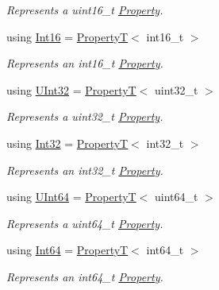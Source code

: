 \begin{DoxyCompactItemize}
\begin{DoxyCompactList}\small\item\em Represents a {\ttfamily uint16\+\_\+t} \hyperlink{classdg_1_1deepcore_1_1_property}{Property}. \end{DoxyCompactList}\item 
using \hyperlink{group___process_properties_ga1dc9580e4c353c4fbe9f0b5908bc474a}{Int16} = \hyperlink{structdg_1_1deepcore_1_1_property_t}{PropertyT}$<$ int16\+\_\+t $>$
\begin{DoxyCompactList}\small\item\em Represents an {\ttfamily int16\+\_\+t} \hyperlink{classdg_1_1deepcore_1_1_property}{Property}. \end{DoxyCompactList}\item 
using \hyperlink{group___process_properties_gaf4b72b7a32150a9db0aa1ce09139aa15}{U\+Int32} = \hyperlink{structdg_1_1deepcore_1_1_property_t}{PropertyT}$<$ uint32\+\_\+t $>$
\begin{DoxyCompactList}\small\item\em Represents a {\ttfamily uint32\+\_\+t} \hyperlink{classdg_1_1deepcore_1_1_property}{Property}. \end{DoxyCompactList}\item 
using \hyperlink{group___process_properties_gaccf8e71b795f75082ef758708db84edd}{Int32} = \hyperlink{structdg_1_1deepcore_1_1_property_t}{PropertyT}$<$ int32\+\_\+t $>$
\begin{DoxyCompactList}\small\item\em Represents an {\ttfamily int32\+\_\+t} \hyperlink{classdg_1_1deepcore_1_1_property}{Property}. \end{DoxyCompactList}\item 
using \hyperlink{group___process_properties_gaf685658c29eaa69a10141e875f7330d7}{U\+Int64} = \hyperlink{structdg_1_1deepcore_1_1_property_t}{PropertyT}$<$ uint64\+\_\+t $>$
\begin{DoxyCompactList}\small\item\em Represents a {\ttfamily uint64\+\_\+t} \hyperlink{classdg_1_1deepcore_1_1_property}{Property}. \end{DoxyCompactList}\item 
using \hyperlink{group___process_properties_ga14986faaf41e6ead7ab0b1be59e40d00}{Int64} = \hyperlink{structdg_1_1deepcore_1_1_property_t}{PropertyT}$<$ int64\+\_\+t $>$
\begin{DoxyCompactList}\small\item\em Represents an {\ttfamily int64\+\_\+t} \hyperlink{classdg_1_1deepcore_1_1_property}{Property}. \end{DoxyCompactList}\item 

\end{DoxyCompactItemize}
